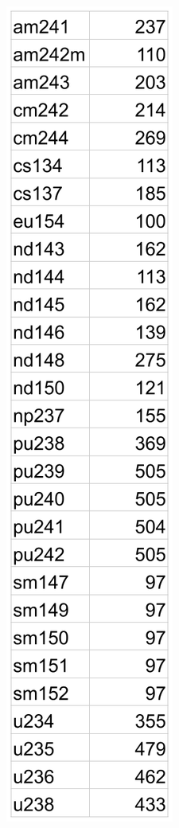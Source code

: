 \begin{frame}
\begin{adjustwidth}{-15pt}{0pt}
\begin{minipage}{0.15\textwidth}
\begin{table}
      \includegraphics[height=0.89\textheight]{./figures/sfcompo_nuc_counts.png}
    \end{table}
  \end{minipage}
  \end{adjustwidth}
\end{frame}
